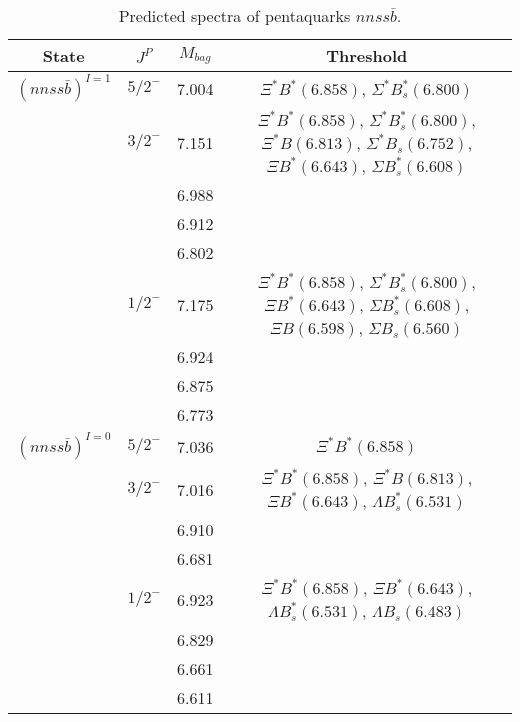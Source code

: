 \documentclass[prd,twocolumn,floatfix,nofootinbib]{revtex4}
\begin{document}
\renewcommand{\tabcolsep}{0.5cm}
\renewcommand{\arraystretch}{1.2}
\begin{table*}[!htbp]
    \caption{Predicted spectra of pentaquarks $nnss\bar{b}$.}
    \begin{tabular}{cccc}
        \hline\hline
        {\rm State} &$J^{P}$ &$M_{bag}$ &{\rm Threshold} \\ \hline
        ${(nnss\bar{b})}^{I=1}$
            &${5/2}^{-}$    &7.004 &$\Xi^{\ast} B^{\ast}(6.858)$, $\Sigma^{\ast} B^{\ast}_{s}(6.800)$ \\
            &${3/2}^{-}$    &7.151 &$\Xi^{\ast} B^{\ast}(6.858)$, $\Sigma^{\ast} B^{\ast}_{s}(6.800)$, $\Xi^{\ast} B(6.813)$, $\Sigma^{\ast} B_{s}(6.752)$, $\Xi B^{\ast}(6.643)$, $\Sigma B^{\ast}_{s}(6.608)$ \\
            &               &6.988 & \\
            &               &6.912 & \\
            &               &6.802 & \\
            &${1/2}^{-}$    &7.175 &$\Xi^{\ast} B^{\ast}(6.858)$, $\Sigma^{\ast} B^{\ast}_{s}(6.800)$, $\Xi B^{\ast}(6.643)$, $\Sigma B^{\ast}_{s}(6.608)$, $\Xi B(6.598)$, $\Sigma B_{s}(6.560)$ \\
            &               &6.924 & \\
            &               &6.875 & \\
            &               &6.773 & \\
        ${(nnss\bar{b})}^{I=0}$
            &${5/2}^{-}$    &7.036 &$\Xi^{\ast} B^{\ast}(6.858)$ \\
            &${3/2}^{-}$    &7.016 &$\Xi^{\ast} B^{\ast}(6.858)$, $\Xi^{\ast} B(6.813)$, $\Xi B^{\ast}(6.643)$, $\Lambda B^{\ast}_{s}(6.531)$ \\
            &               &6.910 & \\
            &               &6.681 & \\
            &${1/2}^{-}$    &6.923 &$\Xi^{\ast} B^{\ast}(6.858)$, $\Xi B^{\ast}(6.643)$, $\Lambda B^{\ast}_{s}(6.531)$, $\Lambda B_{s}(6.483)$ \\
            &               &6.829 & \\
            &               &6.661 & \\
            &               &6.611 & \\
        \hline\hline
    \end{tabular}
\end{table*}
\end{document}
